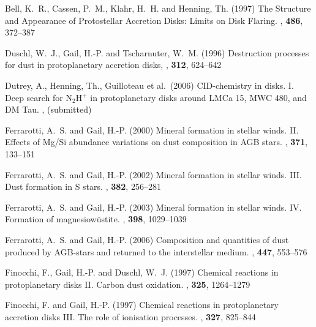 %
%
%
%
\begin{ownpubl}

\item
Bell, K.~R., Cassen, P.~M., Klahr, H.~H. and Henning, Th. (1997)
The Structure and Appearance of Protostellar Accretion Disks: Limits on Disk
Flaring. \apj, \textbf{486}, 372--387

\item
Duschl, W.~J., Gail, H.-P. and Tscharnuter, W.~M. (1996) Destruction
processes for dust in protoplanetary accretion disks, \aap, \textbf{312},
624--642

\item
Dutrey, A., Henning, Th., Guilloteau et al.~(2006) CID-chemistry in disks. I. Deep search for N$_2$H$^+$ in protoplanetary disks around LMCa 15, MWC 480, and DM
Tau. \aap, (submitted)

\item
Ferrarotti, A.~S. and Gail, H.-P. (2000) Mineral formation in stellar winds. II.
Effects of Mg/Si abundance variations on dust composition in AGB stars. \aap,
\textbf{371}, 133--151

\item
Ferrarotti, A.~S. and Gail, H.-P. (2002) Mineral formation in stellar winds.
III. Dust formation in S stars. \aap, \textbf{382}, 256--281


\item
Ferrarotti, A.~S. and Gail, H.-P. (2003) Mineral formation in stellar winds. IV.
Formation of magnesiow{\"u}stite. \aap, \textbf{398}, 1029--1039

\item
Ferrarotti, A.~S. and Gail, H.-P. (2006) Composition and quantities of dust
produced by AGB-stars and returned to the interstellar medium. \aap,
\textbf{447}, 553--576

\item
Finocchi, F., Gail, H.-P. and Duschl, W.~J. (1997) Chemical reactions in
protoplanetary disks II. Carbon dust oxidation. \aap, \textbf{325}, 1264--1279

\item
Finocchi, F. and Gail, H.-P. (1997) Chemical reactions in protoplanetary
accretion disks III. The role of ionisation processes. \aap, \textbf{327}, 825--844


\end{ownpubl}
